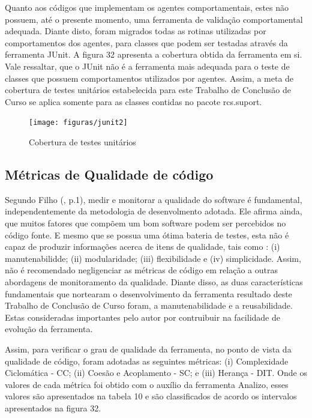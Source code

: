 Quanto aos códigos que implementam os agentes comportamentais, estes não possuem, até o presente momento, uma ferramenta de validação comportamental adequada. Diante disto, foram migrados todas as rotinas utilizadas por comportamentos dos agentes, para classes que podem ser testadas através da ferramenta JUnit. A figura 32 apresenta a cobertura obtida da ferramenta em si. Vale ressaltar, que o JUnit não é a ferramenta mais adequada para o teste de classes que possuem comportamentos utilizados por agentes. Assim, a meta de cobertura de testes unitários estabelecida para este Trabalho de Conclusão de Curso se aplica somente para as classes contidas no pacote rcs.suport.

\begin{figure}[h]
\centering
\label{f22}
\texttt{[image: figuras/junit2]}
\caption{Cobertura de testes unitários}

\end{figure}
\FloatBarrier


\subsection{Métricas de Qualidade de código}

Segundo Filho (\citeyear{filho2013}, p.1), medir e monitorar a qualidade do software é fundamental, independentemente da metodologia de desenvolmento adotada. Ele afirma ainda, que muitos fatores que compõem um bom software podem ser percebidos no código fonte. E mesmo que se possua uma ótima bateria de testes, esta não é capaz de produzir informações acerca de itens de qualidade, tais como : (i) manutenabilidde; (ii) modularidade; (iii) flexibilidade e (iv) simplicidade. Assim, não é recomendado negligenciar as métricas de código em relação a outras abordagens de monitoramento da qualidade. Diante disso, as duas características fundamentais que nortearam o desenvolvimento da ferramenta resultado deste Trabalho de Conclusão de Curso foram, a manutenabilidade e a reusabilidade. Estas consideradas importantes pelo autor por contruibuir na facilidade de evolução da ferramenta. 

Assim, para verificar o grau de qualidade da ferramenta, no ponto de vista da qualidade de código, foram adotadas as seguintes métricas: (i) Complexidade Ciclomática - CC; (ii)  Coesão e Acoplamento  - SC; e (iii) Herança - DIT. Onde os valores de cada métrica foi obtido com o auxílio da ferramenta Analizo, esses valores são apresentados na tabela 10 e são classificados de acordo os intervalos apresentados na figura 32.

